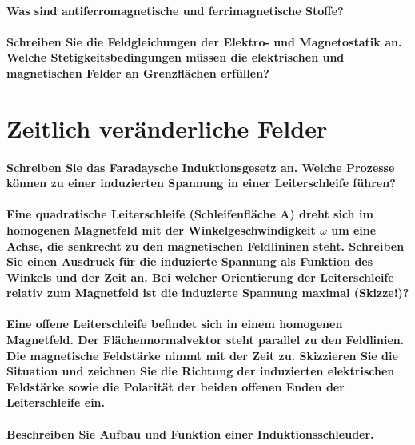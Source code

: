 \documentclass[a4paper, 11pt, parskip=half]{scrartcl}
\begin{document}
\paragraph{Was sind antiferromagnetische und ferrimagnetische Stoffe?}

\paragraph{Schreiben Sie die Feldgleichungen der Elektro- und Magnetostatik an. Welche
Stetigkeitsbedingungen müssen die elektrischen und magnetischen Felder an Grenzflächen erfüllen?}

\newpage

\section{Zeitlich veränderliche Felder}

\paragraph{Schreiben Sie das Faradaysche Induktionsgesetz an. Welche Prozesse können zu einer
induzierten Spannung in einer Leiterschleife führen?}

\paragraph{Eine quadratische Leiterschleife (Schleifenfläche A) dreht sich im homogenen Magnetfeld
mit der Winkelgeschwindigkeit $\omega$ um eine Achse, die senkrecht zu den magnetischen Feldlininen
steht. Schreiben Sie einen Ausdruck für die induzierte Spannung als Funktion des Winkels und der
Zeit an. Bei welcher Orientierung der Leiterschleife relativ zum Magnetfeld ist die induzierte
Spannung maximal (Skizze!)?}

\paragraph{Eine offene Leiterschleife befindet sich in einem homogenen Magnetfeld. Der
Flächennormalvektor steht parallel zu den Feldlinien. Die magnetische Feldstärke nimmt mit der Zeit
zu. Skizzieren Sie die Situation und zeichnen Sie die Richtung der induzierten elektrischen
Feldstärke sowie die Polarität der beiden offenen Enden der Leiterschleife ein.}

\paragraph{Beschreiben Sie Aufbau und Funktion einer Induktionsschleuder.}
\end{document}
